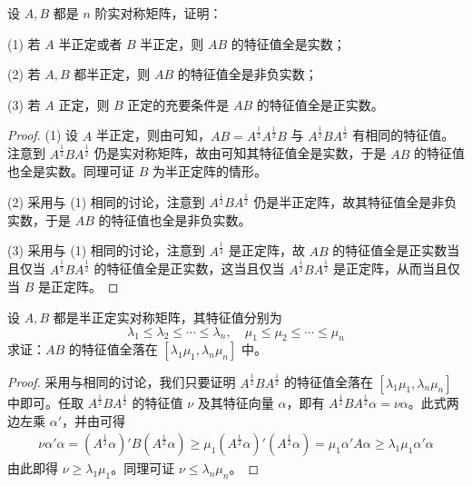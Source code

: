 \documentclass[../../main.tex]{subfiles}
\begin{document}
\begin{proposition}\label{proposition:例9.64}
设 \(A,B\) 都是 \(n\) 阶实对称矩阵，证明：

(1) 若 \(A\) 半正定或者 \(B\) 半正定，则 \(AB\) 的特征值全是实数；

(2) 若 \(A,B\) 都半正定，则 \(AB\) 的特征值全是非负实数；

(3) 若 \(A\) 正定，则 \(B\) 正定的充要条件是 \(AB\) 的特征值全是正实数。
\end{proposition}
\begin{proof}
(1) 设 \(A\) 半正定，则由可知，\(AB = A^{\frac{1}{2}}A^{\frac{1}{2}}B\) 与 \(A^{\frac{1}{2}}BA^{\frac{1}{2}}\) 有相同的特征值。注意到 \(A^{\frac{1}{2}}BA^{\frac{1}{2}}\) 仍是实对称矩阵，故由可知其特征值全是实数，于是 \(AB\) 的特征值也全是实数。同理可证 \(B\) 为半正定阵的情形。

(2) 采用与 (1) 相同的讨论，注意到 \(A^{\frac{1}{2}}BA^{\frac{1}{2}}\) 仍是半正定阵，故其特征值全是非负实数，于是 \(AB\) 的特征值也全是非负实数。

(3) 采用与 (1) 相同的讨论，注意到 \(A^{\frac{1}{2}}\) 是正定阵，故 \(AB\) 的特征值全是正实数当且仅当 \(A^{\frac{1}{2}}BA^{\frac{1}{2}}\) 的特征值全是正实数，这当且仅当 \(A^{\frac{1}{2}}BA^{\frac{1}{2}}\) 是正定阵，从而当且仅当 \(B\) 是正定阵。 
\end{proof}

\begin{proposition}\label{proposition:例9.65}
设 \(A,B\) 都是半正定实对称矩阵，其特征值分别为
\[
\lambda_1 \leqslant  \lambda_2 \leqslant  \cdots \leqslant  \lambda_n,\quad \mu_1 \leqslant  \mu_2 \leqslant  \cdots \leqslant  \mu_n
\]
求证：\(AB\) 的特征值全落在 \([\lambda_1\mu_1,\lambda_n\mu_n]\) 中。
\end{proposition}
\begin{proof}
采用与相同的讨论，我们只要证明 \(A^{\frac{1}{2}}BA^{\frac{1}{2}}\) 的特征值全落在 \([\lambda_1\mu_1,\lambda_n\mu_n]\) 中即可。任取 \(A^{\frac{1}{2}}BA^{\frac{1}{2}}\) 的特征值 \(\nu\) 及其特征向量 \(\alpha\)，即有 \(A^{\frac{1}{2}}BA^{\frac{1}{2}}\alpha = \nu\alpha\)。此式两边左乘 \(\alpha'\)，并由可得
\begin{align*}
\nu\alpha'\alpha = (A^{\frac{1}{2}}\alpha)'B(A^{\frac{1}{2}}\alpha) \geqslant  \mu_1(A^{\frac{1}{2}}\alpha)'(A^{\frac{1}{2}}\alpha) = \mu_1\alpha'A\alpha \geqslant  \lambda_1\mu_1\alpha'\alpha
\end{align*}
由此即得 \(\nu \geqslant  \lambda_1\mu_1\)。同理可证 \(\nu \leqslant  \lambda_n\mu_n\)。
\end{proof}
\end{document}
